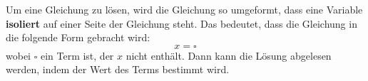 Um eine Gleichung zu lösen, wird die Gleichung so umgeformt, dass eine Variable \textbf{isoliert} auf einer Seite der Gleichung steht. Das bedeutet, dass die Gleichung in die folgende Form gebracht wird:
\[
  x = \square
\]
wobei $\square$ ein Term ist, der $x$ nicht enthält. Dann kann die Lösung abgelesen werden, indem der Wert des Terms bestimmt wird.
